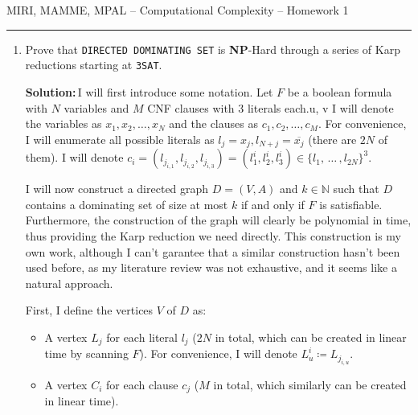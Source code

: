 \documentclass{amsart}
\theoremstyle{plain}
\theoremstyle{definition}
\newcommand{\N}{\mathbb{N}}
\newcommand{\np}{\textbf{NP}}
\newcommand{\sol}{\textbf{Solution:\,}}
\begin{document}
    {\Large MIRI, MAMME, MPAL -- Computational Complexity -- Homework 1}

    \vspace{0.5cm}

    \hrule

    \vspace{0.5cm}

    \begin{enumerate}[label=\textbf{Exercise \arabic*:}, leftmargin=0cm, labelwidth=-0.2cm, align=left]

        \item
            Prove that \verb|DIRECTED DOMINATING SET| is \np-Hard through a series of Karp reductions
            starting at \verb|3SAT|.

            \sol I will first introduce some notation.
            Let $F$ be a boolean formula with $N$ variables and $M$ CNF
            clauses with $3$ literals each.u,  v
            I will denote the variables as $x_1, x_2, \ldots, x_N$ and the clauses as $c_1, c_2, \ldots, c_M$.
            For convenience, I will enumerate all possible literals as $l_j = x_j, l_{N+j} = \overline{x_j}$
            (there are $2N$ of them).
            I will denote
            $c_i = \left( l_{j_{i, 1}}, l_{j_{i, 2}}, l_{j_{i, 3}} \right) =
            \left( l^i_1, l^i_2, l^i_3 \right)
            \in \{l_1, \, \dots \, , l_{2N}\}^3$.

            I will now construct a directed graph $D = (V, A)$ and $k \in \N$ such that
            $D$ contains a dominating set of size at most $k$ if and only if $F$ is satisfiable.
            Furthermore, the construction of the graph will clearly be polynomial in time,
            thus providing the Karp reduction we need directly.
            This construction is my own work, although I can't garantee that
            a similar construction hasn't been used before, as my literature review was not exhaustive,
            and it seems like a natural approach.


            First, I define the vertices $V$ of $D$ as:
            \begin{itemize}
                \item A vertex $L_j$ for each literal $l_j$
                ($2N$ in total, which can be created in linear time by scanning $F$).
                For convenience, I will denote $L^i_u \coloneqq L_{j_{i, u}}$.

                \item A vertex $C_i$ for each clause $c_j$ ($M$ in total, which similarly can be created in linear time).


\end{itemize}
\end{enumerate}
\end{document}

